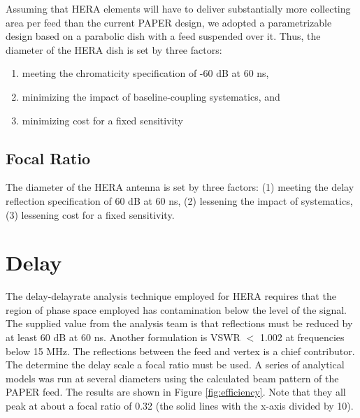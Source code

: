 \documentclass[11pt]{article}
\begin{document}
Assuming that HERA elements will have to deliver substantially more collecting area per feed
than the current PAPER design, we adopted a parametrizable design based on a parabolic dish
with a feed suspended over it.
Thus, the diameter of the HERA dish is set by three factors:  
\begin{enumerate}
\item meeting the chromaticity specification of -60 dB at 60 ns, %
\item minimizing the impact of baseline-coupling systematics, and %
\item minimizing cost for a fixed sensitivity
\end{enumerate}

\subsection{Focal Ratio}
The diameter of the HERA antenna is set by three factors:  (1) meeting the delay reflection specification of 60 dB at 60 ns, (2) lessening the impact of systematics, (3) lessening cost for a fixed sensitivity.

\section{Delay}
The delay-delayrate analysis technique employed for HERA requires that the region of phase space employed has contamination below the level of the signal.  The supplied value from the analysis team is that reflections must be reduced by at least 60 dB at 60 ns.  Another formulation is VSWR $<$ 1.002 at frequencies below 15 MHz.  The reflections between the feed and vertex is a chief contributor.  The determine the delay scale a focal ratio must be used.  A series of analytical models was run at several diameters using the calculated beam pattern of the PAPER feed.  The results are shown in Figure \ref{fig:efficiency}.  Note that they all peak at about a focal ratio of 0.32 (the solid lines with the x-axis divided by 10).
\end{document}
